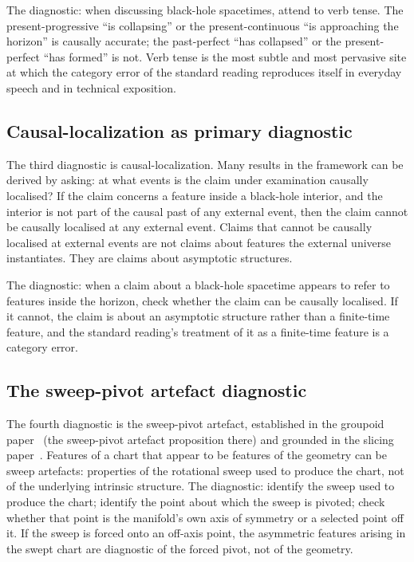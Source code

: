 \documentclass[11pt,a4paper]{article}
\theoremstyle{definition}
\begin{document}
The diagnostic: when discussing black-hole spacetimes, attend to verb tense. The present-progressive ``is collapsing'' or the present-continuous ``is approaching the horizon'' is causally accurate; the past-perfect ``has collapsed'' or the present-perfect ``has formed'' is not. Verb tense is the most subtle and most pervasive site at which the category error of the standard reading reproduces itself in everyday speech and in technical exposition.

\subsection{Causal-localization as primary diagnostic}\label{sec:diagnostic-causal}

The third diagnostic is causal-localization. Many results in the framework can be derived by asking: at what events is the claim under examination causally localised? If the claim concerns a feature inside a black-hole interior, and the interior is not part of the causal past of any external event, then the claim cannot be causally localised at any external event. Claims that cannot be causally localised at external events are not claims about features the external universe instantiates. They are claims about asymptotic structures.

The diagnostic: when a claim about a black-hole spacetime appears to refer to features inside the horizon, check whether the claim can be causally localised. If it cannot, the claim is about an asymptotic structure rather than a finite-time feature, and the standard reading's treatment of it as a finite-time feature is a category error.

\subsection{The sweep-pivot artefact diagnostic}\label{sec:diagnostic-sweep}

The fourth diagnostic is the sweep-pivot artefact, established in the groupoid paper~\cite{JanzenGroupoid} (the sweep-pivot artefact proposition there) and grounded in the slicing paper~\cite{JanzenSlicing}. Features of a chart that appear to be features of the geometry can be sweep artefacts: properties of the rotational sweep used to produce the chart, not of the underlying intrinsic structure. The diagnostic: identify the sweep used to produce the chart; identify the point about which the sweep is pivoted; check whether that point is the manifold's own axis of symmetry or a selected point off it. If the sweep is forced onto an off-axis point, the asymmetric features arising in the swept chart are diagnostic of the forced pivot, not of the geometry.
\end{document}
